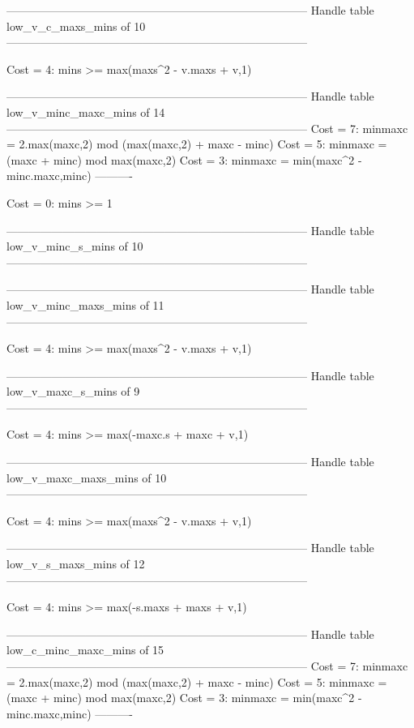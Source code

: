 --------------------------------------------------------------------------------
Handle table low_v_c_maxs_mins of 10
--------------------------------------------------------------------------------

Cost =  4:  mins >= max(maxs^2 - v.maxs + v,1)

--------------------------------------------------------------------------------
Handle table low_v_minc_maxc_mins of 14
--------------------------------------------------------------------------------
Cost =  7:  minmaxc = 2.max(maxc,2) mod (max(maxc,2) + maxc - minc)
Cost =  5:  minmaxc = (maxc + minc) mod max(maxc,2)
Cost =  3:  minmaxc = min(maxc^2 - minc.maxc,minc)
----------

Cost =  0:  mins >= 1

--------------------------------------------------------------------------------
Handle table low_v_minc_s_mins of 10
--------------------------------------------------------------------------------


--------------------------------------------------------------------------------
Handle table low_v_minc_maxs_mins of 11
--------------------------------------------------------------------------------

Cost =  4:  mins >= max(maxs^2 - v.maxs + v,1)

--------------------------------------------------------------------------------
Handle table low_v_maxc_s_mins of 9
--------------------------------------------------------------------------------

Cost =  4:  mins >= max(-maxc.s + maxc + v,1)

--------------------------------------------------------------------------------
Handle table low_v_maxc_maxs_mins of 10
--------------------------------------------------------------------------------

Cost =  4:  mins >= max(maxs^2 - v.maxs + v,1)

--------------------------------------------------------------------------------
Handle table low_v_s_maxs_mins of 12
--------------------------------------------------------------------------------

Cost =  4:  mins >= max(-s.maxs + maxs + v,1)

--------------------------------------------------------------------------------
Handle table low_c_minc_maxc_mins of 15
--------------------------------------------------------------------------------
Cost =  7:  minmaxc = 2.max(maxc,2) mod (max(maxc,2) + maxc - minc)
Cost =  5:  minmaxc = (maxc + minc) mod max(maxc,2)
Cost =  3:  minmaxc = min(maxc^2 - minc.maxc,minc)
----------

